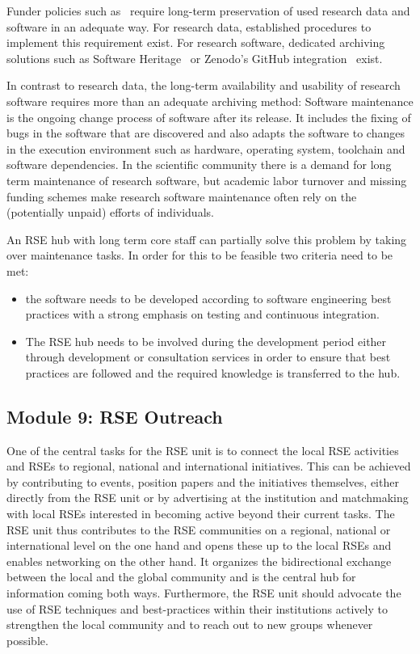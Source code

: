 \documentclass[a4paper]{article}
\begin{document}
Funder policies such as~\autocite{dfg_gsp} require long-term preservation of used research data and software in an adequate way.
For research data, established procedures to implement this requirement exist.
For research software, dedicated archiving solutions such as Software Heritage~\autocite{DiCosmo2020,DiCosmo2023} or Zenodo's GitHub integration~\autocite{GitHubZenodo} exist.

In contrast to research data, the long-term availability and usability of research software requires more than an adequate archiving method:
Software maintenance is the ongoing change process of software after its release.
It includes the fixing of bugs in the software that are discovered and also adapts the software to changes in the execution environment such as hardware, operating system, toolchain and software dependencies.
In the scientific community there is a demand for long term maintenance of research software,
but academic labor turnover and missing funding schemes make research software maintenance often rely on the (potentially unpaid) efforts of individuals.

An RSE hub with long term core staff can partially solve this problem by taking over maintenance tasks.
In order for this to be feasible two criteria need to be met:
\begin{itemize}
\item the software needs to be developed according to software engineering best practices with a strong emphasis on testing and continuous integration.
\item The RSE hub needs to be involved during the development period either through development or consultation services in order to ensure that best practices are followed and the required knowledge is transferred to the hub.
\end{itemize}

\subsection{Module 9: RSE Outreach}%
\label{sec:outreach}

One of the central tasks for the RSE unit is to connect the local RSE activities and RSEs to regional, national and international initiatives.
This can be achieved by contributing to events, position papers and the initiatives themselves,
either directly from the RSE unit or by advertising at the institution and matchmaking with local RSEs interested in becoming active beyond their current tasks.
The RSE unit thus contributes to the RSE communities on a regional, national or international level on the one hand and opens these up to the local RSEs and enables networking on the other hand.
It organizes the bidirectional exchange between the local and the global community and is the central hub for information coming both ways.
Furthermore, the RSE unit should advocate the use of RSE techniques and best-practices within their institutions actively to strengthen the local community and to reach out to new groups whenever possible.
\end{document}
